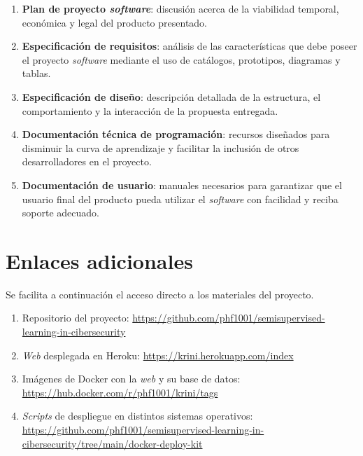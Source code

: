 \begin{enumerate}
	\item \textbf{Plan de proyecto \textit{software}}: discusión acerca de la viabilidad temporal, económica y legal del producto presentado.
	\item \textbf{Especificación de requisitos}: análisis de las características que debe poseer el proyecto \textit{software} mediante el uso de catálogos, prototipos, diagramas y tablas.
	\item \textbf{Especificación de diseño}: descripción detallada de la estructura,
	el comportamiento y la interacción de la propuesta entregada.
	\item \textbf{Documentación técnica de programación}: recursos diseñados para disminuir la curva de aprendizaje y facilitar la inclusión de otros desarrolladores en el proyecto.
	\item \textbf{Documentación de usuario}: manuales necesarios para garantizar que el usuario final del producto pueda utilizar el \textit{software} con facilidad y reciba soporte adecuado.
\end{enumerate} 

\section{Enlaces adicionales}

Se facilita a continuación el acceso directo a los materiales del proyecto.

\begin{enumerate}
	\item Repositorio del proyecto:
	\url{https://github.com/phf1001/semisupervised-learning-in-cibersecurity}
	\item \textit{Web} desplegada en Heroku: \url{https://krini.herokuapp.com/index}
	\item Imágenes de Docker con la \textit{web} y su base de datos: \url{https://hub.docker.com/r/phf1001/krini/tags}
	\item \textit{Scripts} de despliegue en distintos sistemas operativos: \url{https://github.com/phf1001/semisupervised-learning-in-cibersecurity/tree/main/docker-deploy-kit}
\end{enumerate}